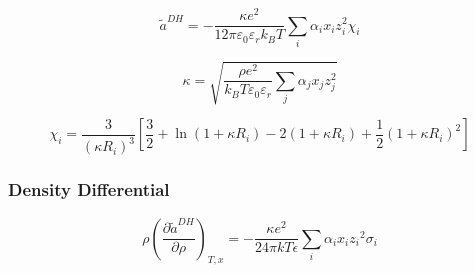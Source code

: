 \documentclass[12pt, letterpaper]{article}
\begin{document}

\begin{equation}
    \tilde{a}^{DH}=-\frac{\kappa e^{2}}{12\pi\varepsilon_{0}\varepsilon_{r}k_{B}T}\sum_{i}\alpha_{i}x_{i}z_{i}^{2}\chi_{i}
    \label{eq:ares_dh_bjerrum}
\end{equation}


\begin{equation}
    \kappa=\sqrt{\frac{\rho e^{2}}{k_{B}T\varepsilon_{0}\varepsilon_{r}}\sum_{j}\alpha_{j}x_{j}z_{j}^{2}}
    \label{eq:kappa_dh_bjerrum}
\end{equation}


\begin{equation}
    \chi_{i}=\frac{3}{\left(\kappa R_{i}\right)^3}\left[\frac{3}{2}+\ln(1+\kappa R_{i})-2(1+\kappa R_{i})+\frac{1}{2}\left(1+\kappa R_{i}\right)^2\right]
    \label{eq:chi_dh_bjerrum}
\end{equation}

\subsubsection{Density Differential}


\begin{equation}
    \rho\left(\frac{\partial\tilde{a}^{DH}}{\partial\rho}\right)_{T,x}
    =-\frac{\kappa e^2}{24\pi kT\epsilon}\sum_{i}\alpha _{i}x_{i}z_{i}{}^{2}\sigma_{i}
    \label{eq:dadrho_dh_bjerrum}
\end{equation}
\end{document}
